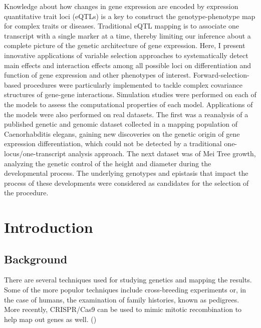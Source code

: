 \documentclass[11pt,]{book}
\theoremstyle{definition}
\theoremstyle{definition}
\theoremstyle{remark}
\begin{document}
\begin{center}
Knowledge about how changes in gene expression are encoded by expression quantitative trait loci (eQTLs) is a key to construct the genotype-phenotype map for complex traits or diseases. Traditional eQTL mapping is to associate one transcript with a single marker at a time, thereby limiting our inference about a complete picture of the genetic architecture of gene expression. Here, I present innovative applications of variable selection approaches to systematically detect main effects and interaction effects among all possible loci on differentiation and function of gene expression and other phenotypes of interest. Forward-selection-based procedures were particularly implemented to tackle complex covariance structures of gene-gene interactions. Simulation studies were performed on each of the models to assess the computational properties of each model.  Applications of the models were also performed on real datasets.  The first was a reanalysis of a published genetic and genomic dataset collected in a mapping population of Caenorhabditis elegans, gaining new discoveries on the genetic origin of gene expression differentiation, which could not be detected by a traditional one-locus/one-transcript analysis approach.  The next dataset was of Mei Tree growth, analyzing the genetic control of the height and diameter during the developmental process.  The underlying genotypes and epistasis that impact the process of these developments were considered as candidates for the selection of the procedure.

\end{center}

{
\setcounter{tocdepth}{1}
\tableofcontents
}
\listoftables
\listoffigures
\chapter{Introduction}\label{intro}

 \setcounter{page}{1}

\section{Background}\label{background}

There are several techniques used for studying genetics and mapping the
results. Some of the more populor techniques include cross-breeding
experiments or, in the case of humans, the examination of family
histories, known as pedigrees. More recently, CRISPR/Cas9 can be used to
mimic mitotic recombination to help map out genes as well.
(\cite{sadhu2016crispr})
\end{document}
